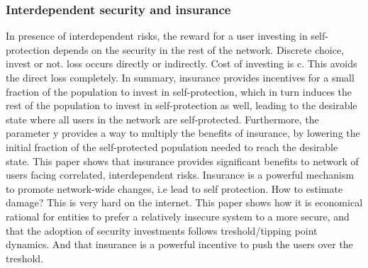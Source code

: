 \subsubsection{Interdependent security and insurance}
In presence of interdependent risks, the reward for a user investing in self-protection depends on the security in the rest of the network.
Discrete choice, invest or not. loss occurs directly or indirectly. Cost of investing is c. This avoids the direct loss completely. 
In summary, insurance provides incentives for a
small fraction of the population to invest in self-protection, which in turn induces the rest
of the population to invest in self-protection as well, leading to the desirable state where
all users in the network are self-protected. Furthermore, the parameter y provides a way
to multiply the benefits of insurance, by lowering the initial fraction of the self-protected
population needed to reach the desirable state.
This paper shows that insurance provides significant benefits to network of users facing correlated, 
interdependent risks. Insurance is a powerful mechanism to promote network-wide changes, i.e lead to self protection.
How to estimate damage? This is very hard on the internet. 
This paper shows how it is economical rational for entities to prefer a relatively 
insecure system to a more secure, and that the adoption of security investments follows treshold/tipping point dynamics. 
And that insurance is a powerful incentive to push the users over the treshold.

